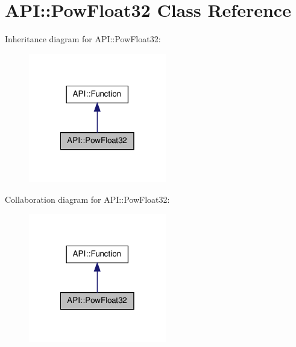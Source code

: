 \hypertarget{class_a_p_i_1_1_pow_float32}{\section{A\-P\-I\-:\-:Pow\-Float32 Class Reference}
\label{class_a_p_i_1_1_pow_float32}
}


Inheritance diagram for A\-P\-I\-:\-:Pow\-Float32\-:\nopagebreak
\begin{figure}[H]
\begin{center}
\leavevmode
\includegraphics[width=170pt]{class_a_p_i_1_1_pow_float32__inherit__graph}
\end{center}
\end{figure}


Collaboration diagram for A\-P\-I\-:\-:Pow\-Float32\-:\nopagebreak
\begin{figure}[H]
\begin{center}
\leavevmode
\includegraphics[width=170pt]{class_a_p_i_1_1_pow_float32__coll__graph}
\end{center}
\end{figure}
